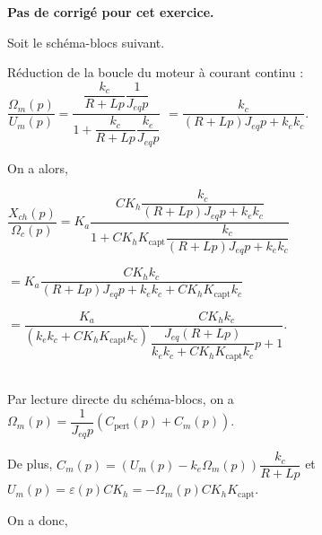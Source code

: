 \normaltrue \difficilefalse \tdifficilefalse
\correctiontrue


\setcounter{numques}{0}
\ifcorrection
\else
\textbf{Pas de corrigé pour cet exercice.}
\fi

\ifprof
\else
Soit le schéma-blocs suivant. 
\begin{figure}[H]
\centering
{}
\end{figure}
\fi

\ifprof
Réduction de la boucle du moteur à courant continu : 
$\dfrac{\Omega_m(p)}{U_m(p)}=\dfrac{\dfrac{k_c}{R+Lp}\dfrac{1}{J_{eq}p}}{1+\dfrac{k_c}{R+Lp}\dfrac{k_e}{J_{eq}p}}$
$=\dfrac{k_c}{\left(R+Lp\right)J_{eq}p+k_ek_c}$.

On a alors, 

$
\dfrac{X_{ch}(p)}{\Omega_c(p)} =
K_a  \dfrac{CK_h \dfrac{k_c}{\left(R+Lp\right)J_{eq}p+k_ek_c}}{1+CK_hK_{\text{capt}} \dfrac{k_c}{\left(R+Lp\right)J_{eq}p+k_ek_c}}
$ 

$
=
K_a \dfrac{CK_h k_c}{\left(R+Lp\right)J_{eq}p+k_ek_c+CK_hK_{\text{capt}} k_c}
$

$
=
\dfrac{K_a }{\left( k_ek_c+CK_hK_{\text{capt}} k_c\right)} \dfrac{CK_h k_c}{\dfrac{J_{eq}\left(R+Lp\right)}{k_ek_c+CK_hK_{\text{capt}} k_c}p+1}
$.

\else
\fi

\ifprof ~\\
Par lecture directe du schéma-blocs, on a 
$\Omega_m(p) = \dfrac{1}{J_{eq}p}\left(C_{\text{pert}}(p) + C_m(p)\right)$.

De plus, 
$C_m(p) = \left(U_m(p)-k_e\Omega_m(p)\right) \dfrac{k_c}{R+Lp}$
 et $U_m(p)=\varepsilon(p) C K_h = -\Omega_m(p) C K_h K_{\text{capt}}$.
 
 On a donc, 
 
